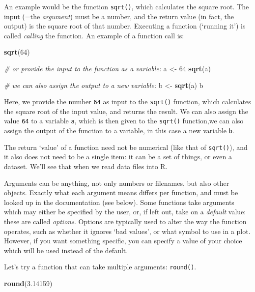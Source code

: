 \documentclass[
]{book}
\newenvironment{Shaded}{\begin{snugshade}}{\end{snugshade}}
\newcommand{\CommentTok}[1]{\textcolor[rgb]{0.56,0.35,0.01}{\textit{#1}}}
\newcommand{\DecValTok}[1]{\textcolor[rgb]{0.00,0.00,0.81}{#1}}
\newcommand{\FloatTok}[1]{\textcolor[rgb]{0.00,0.00,0.81}{#1}}
\newcommand{\FunctionTok}[1]{\textcolor[rgb]{0.13,0.29,0.53}{\textbf{#1}}}
\newcommand{\NormalTok}[1]{#1}
\newcommand{\OtherTok}[1]{\textcolor[rgb]{0.56,0.35,0.01}{#1}}
\begin{document}
An example would be the function \texttt{sqrt()}, which calculates the square root. The
input (=the \emph{argument}) must be a number, and the return value (in fact, the
output) is the square root of that number. Executing a function (`running it') is called \emph{calling} the function. An example of a function call is:

\begin{Shaded}
\begin{Highlighting}[]
\FunctionTok{sqrt}\NormalTok{(}\DecValTok{64}\NormalTok{)}

\CommentTok{\# or provide the input to the function as a variable:}
\NormalTok{a }\OtherTok{\textless{}{-}} \DecValTok{64}
\FunctionTok{sqrt}\NormalTok{(a)}

\CommentTok{\# we can also assign the output to a new variable:}
\NormalTok{b }\OtherTok{\textless{}{-}} \FunctionTok{sqrt}\NormalTok{(a)}
\NormalTok{b}
\end{Highlighting}
\end{Shaded}

Here, we provide the number \texttt{64} as input to the \texttt{sqrt()} function, which
calculates the square root of the input value, and returns the result. We can also assign the value \texttt{64} to a variable \texttt{a}, which is then given to the \texttt{sqrt()} function,we can also assign the output of the function to a variable, in this case a new variable \texttt{b}.

The return `value' of a function need not be numerical (like that of \texttt{sqrt()}),
and it also does not need to be a single item: it can be a set of things, or
even a dataset. We'll see that when we read data files into R.

Arguments can be anything, not only numbers or filenames, but also other
objects. Exactly what each argument means differs per function, and must be
looked up in the documentation (see below). Some functions take arguments which
may either be specified by the user, or, if left out, take on a \emph{default} value:
these are called \emph{options}. Options are typically used to alter the way the
function operates, such as whether it ignores `bad values', or what symbol to
use in a plot. However, if you want something specific, you can specify a value
of your choice which will be used instead of the default.

Let's try a function that can take multiple arguments: \texttt{round()}.

\begin{Shaded}
\begin{Highlighting}[]
\FunctionTok{round}\NormalTok{(}\FloatTok{3.14159}\NormalTok{)}
\end{Highlighting}
\end{Shaded}
\end{document}
